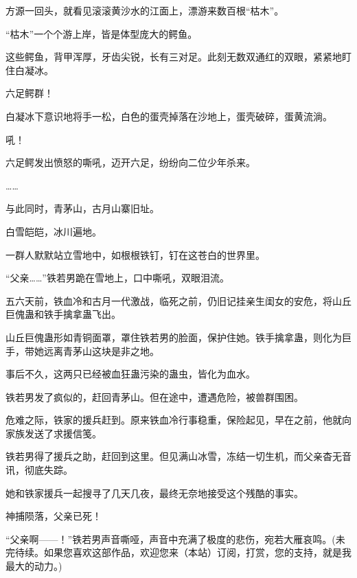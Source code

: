 \begin{this_body}
方源一回头，就看见滚滚黄沙水的江面上，漂游来数百根“枯木”。

“枯木”一个个游上岸，皆是体型庞大的鳄鱼。

这些鳄鱼，背甲浑厚，牙齿尖锐，长有三对足。此刻无数双通红的双眼，紧紧地盯住白凝冰。

六足鳄群！

白凝冰下意识地将手一松，白色的蛋壳掉落在沙地上，蛋壳破碎，蛋黄流淌。

吼！

六足鳄发出愤怒的嘶吼，迈开六足，纷纷向二位少年杀来。

……

与此同时，青茅山，古月山寨旧址。

白雪皑皑，冰川遍地。

一群人默默站立雪地中，如根根铁钉，钉在这苍白的世界里。

“父亲……”铁若男跪在雪地上，口中嘶吼，双眼泪流。

五六天前，铁血冷和古月一代激战，临死之前，仍旧记挂亲生闺女的安危，将山丘巨傀蛊和铁手擒拿蛊飞出。

山丘巨傀蛊形如青铜面罩，罩住铁若男的脸面，保护住她。铁手擒拿蛊，则化为巨手，带她远离青茅山这块是非之地。

事后不久，这两只已经被血狂蛊污染的蛊虫，皆化为血水。

铁若男发了疯似的，赶回青茅山。但在途中，遭遇危险，被兽群围困。

危难之际，铁家的援兵赶到。原来铁血冷行事稳重，保险起见，早在之前，他就向家族发送了求援信笺。

铁若男得了援兵之助，赶回到这里。但见满山冰雪，冻结一切生机，而父亲杳无音讯，彻底失踪。

她和铁家援兵一起搜寻了几天几夜，最终无奈地接受这个残酷的事实。

神捕陨落，父亲已死！

“父亲啊——！”铁若男声音嘶哑，声音中充满了极度的悲伤，宛若大雁哀鸣。(未完待续。如果您喜欢这部作品，欢迎您来（本站）订阅，打赏，您的支持，就是我最大的动力。)

\end{this_body}

